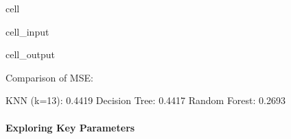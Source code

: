 \documentclass[letterpaper,10pt,english]{jupyterBook}
\begin{document}
\begin{sphinxuseclass}{cell}
\begin{sphinxVerbatimInput}
\begin{sphinxuseclass}{cell_input}
\begin{sphinxVerbatim}[commandchars=\\\{\}]
\end{sphinxVerbatim}

\end{sphinxuseclass}\end{sphinxVerbatimInput}
\begin{sphinxVerbatimOutput}

\begin{sphinxuseclass}{cell_output}
\begin{sphinxVerbatim}[commandchars=\\\{\}]
Comparison of MSE:
\end{sphinxVerbatim}

\begin{sphinxVerbatim}[commandchars=\\\{\}]
KNN (k=13): 0.4419
Decision Tree: 0.4417
Random Forest: 0.2693
\end{sphinxVerbatim}

\end{sphinxuseclass}\end{sphinxVerbatimOutput}

\end{sphinxuseclass}

\paragraph{Exploring Key Parameters}
\label{\detokenize{03:exploring-key-parameters}}
\end{document}
